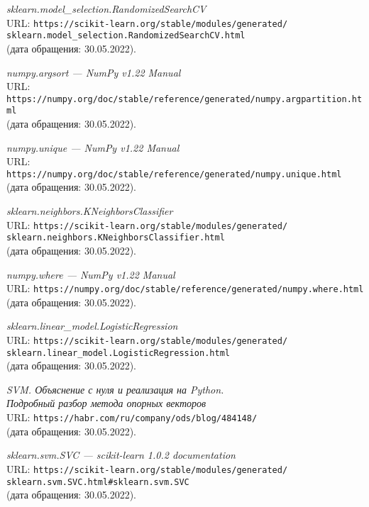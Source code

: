\begin{thebibliography}{99}
{\itshape sklearn.model\_selection.RandomizedSearchCV}\\
URL: \texttt{https://scikit-learn.org/stable/modules/generated/\\sklearn.model\_selection.RandomizedSearchCV.html}\\
(дата обращения: 30.05.2022).

{\itshape numpy.argsort --- NumPy v1.22 Manual}\\
URL: \texttt{https://numpy.org/doc/stable/reference/generated/numpy.argpartition.html}\\
(дата обращения: 30.05.2022).

{\itshape numpy.unique --- NumPy v1.22 Manual}\\
URL: \texttt{https://numpy.org/doc/stable/reference/generated/numpy.unique.html}\\
(дата обращения: 30.05.2022).

{\itshape sklearn.neighbors.KNeighborsClassifier}\\
URL: \texttt{https://scikit-learn.org/stable/modules/generated/\\sklearn.neighbors.KNeighborsClassifier.html}\\
(дата обращения: 30.05.2022).

{\itshape numpy.where --- NumPy v1.22 Manual}\\
URL: \texttt{https://numpy.org/doc/stable/reference/generated/numpy.where.html}\\
(дата обращения: 30.05.2022).

{\itshape sklearn.linear\_model.LogisticRegression}\\
URL: \texttt{https://scikit-learn.org/stable/modules/generated/\\sklearn.linear\_model.LogisticRegression.html}\\
(дата обращения: 30.05.2022).

{\itshape SVM. Объяснение с нуля и реализация на Python.\\Подробный разбор метода опорных векторов}\\
URL: \texttt{https://habr.com/ru/company/ods/blog/484148/}\\
(дата обращения: 30.05.2022).

{\itshape sklearn.svm.SVC --- scikit-learn 1.0.2 documentation}\\
URL: \texttt{https://scikit-learn.org/stable/modules/generated/\\sklearn.svm.SVC.html\#sklearn.svm.SVC}\\
(дата обращения: 30.05.2022).


\end{thebibliography}
